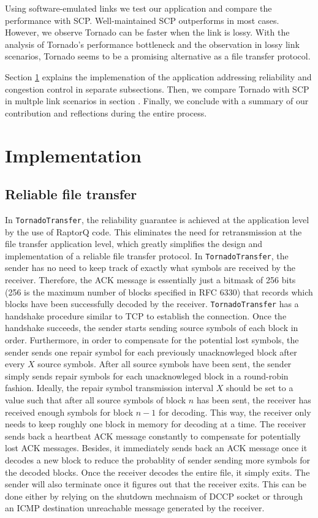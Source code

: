 \documentclass{sig-alternate-10pt}
\begin{document}
Using software-emulated links we test our application and compare the
performance with SCP. Well-maintained SCP outperforms in most cases. However, we
observe Tornado can be faster when the link is lossy. With the analysis of
Tornado's performance bottleneck and the observation in lossy link scenarios,
Tornado seems to be a promising alternative as a file transfer protocol.

Section \ref{s:impl} explains the implemenation of the application addressing
reliability and congestion control in separate subsections. Then, we compare
Tornado with SCP in multple link scenarios in section \label{s:eval}. Finally,
we conclude with a summary of our contribution and reflections during the entire
process.

\section{Implementation}\label{s:impl}

\subsection{Reliable file transfer}

In \texttt{TornadoTransfer}, the reliability guarantee is achieved at the application level by the use of RaptorQ code. This eliminates the need for retransmission at the file transfer application level, which greatly simplifies the design and implementation of a reliable file transfer protocol. In \texttt{TornadoTransfer}, the sender has no need to keep track of exactly what symbols are received by the receiver. Therefore, the ACK message is essentially just a bitmask of 256 bits (256 is the maximum number of blocks specified in RFC 6330) that records which blocks have been successfully decoded by the receiver. \texttt{TornadoTransfer} has a handshake procedure similar to TCP to establish the connection. Once the handshake succeeds, the sender starts sending source symbols of each block in order. Furthermore, in order to compensate for the potential lost symbols, the sender sends one repair symbol for each previously unacknowleged block after every $X$ source symbols. After all source symbols have been sent, the sender simply sends repair symbols for each unacknowleged block in a round-robin fashion. Ideally, the repair symbol transmission interval $X$ should be set to a value such that after all source symbols of block $n$ has been sent, the receiver has received enough symbols for block $n-1$ for decoding. This way, the receiver only needs to keep roughly one block in memory for decoding at a time. The receiver sends back a heartbeat ACK message constantly to compensate for potentially lost ACK messages. Besides, it immediately sends back an ACK message once it decodes a new block to reduce the probablity of sender sending more symbols for the decoded blocks. Once the receiver decodes the entire file, it simply exits. The sender will also terminate once it figures out that the receiver exits. This can be done either by relying on the shutdown mechnaism of DCCP socket or through an ICMP destination unreachable message generated by the receiver.
\end{document}
